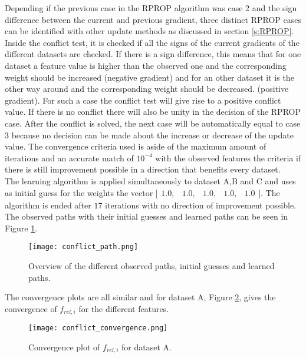 Depending if the previous case in the RPROP algorithm was case 2 and the sign difference between the current and previous gradient, three distinct RPROP cases can be identified with other update methods as discussed in section \ref{s:RPROP}. Inside the conflict test, it is checked if all the signs of the current gradients of the different datasets are checked. If there is a sign difference, this means that for one dataset a feature value is higher than the observed one and the corresponding weight should be increased (negative gradient) and for an other dataset it is the other way around and the corresponding weight should be decreased. (positive gradient). For such a case the conflict test will give rise to a positive conflict value. If there is no conflict there will also be unity in the decision of the RPROP case. After the conflict is solved, the next case will be automatically equal to case 3 because no decision can be made about the increase or decrease of the update value. The convergence criteria used is aside of the maximum amount of iterations and an accurate match of $10^{-4}$ with the observed features the criteria if there is still improvement possible in a direction that benefits every dataset.\\

The learning algorithm is applied simultaneously to dataset A,B and C and uses as initial guess for the weights the vector $\bigl[ \begin{smallmatrix} 1.0,&1.0,&1.0,&1.0,&1.0\end{smallmatrix}\bigr]$. The algorithm is ended after $17$ iterations with no direction of improvement possible. The observed paths with their initial guesses and learned paths can be seen in Figure \ref{fig:conflict_paths}.

 
 \begin{figure}[h!]
 	\centering
 	\texttt{[image: conflict\_path.png]}
 	\caption{Overview of the different observed paths, initial guesses and learned paths.}
 	\label{fig:conflict_paths}
 \end{figure}

The convergence plots are all similar and for dataset A, Figure \ref{fig:conflict_convergence}, gives the convergence of $f_{rel,i}$ for the different features. 
 \begin{figure}[h!]
	\centering
	\texttt{[image: conflict\_convergence.png]}
	\caption{Convergence plot of $f_{rel,i}$ for dataset A.}
	\label{fig:conflict_convergence}
\end{figure}
 
